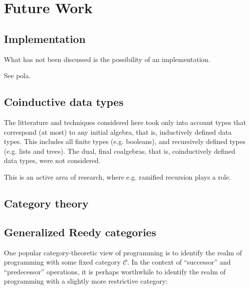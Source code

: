 \chapter{Future Work}

\section{Implementation}

What has not been discussed is the possibility of an implementation.

See pola.

\section{Coinductive data types}

The litterature and techniques considered here took only into account types
that correspond (at most) to any initial algebra, that is, inductively defined
data types. This includes all finite types (e.g. booleans), and recursively
defined types (e.g. lists and trees). The dual, final coalgebras, that is,
coinductively defined data types, were not considered.

This is an active area of research, where e.g. ramified recursion
\cite{ramayaa-leivant-2011} plays a role.

\section{Category theory}

\cite{rutten-1998}

\section{Generalized Reedy categories}


One popular category-theoretic view of programming is to identify the realm of
programming with some fixed category $\mathcal{C}$. In the context of
``successor'' and ``predecessor'' operations, it is perhaps worthwhile to
identify the realm of programming with a slightly more restrictive category:

